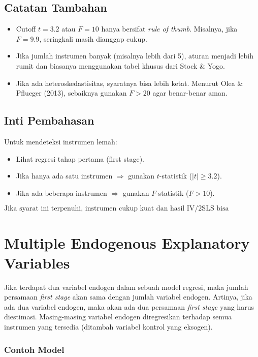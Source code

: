 \documentclass[]{article}
\begin{document}
\subsection*{Catatan Tambahan}
\begin{itemize}
    \item Cutoff $t = 3.2$ atau $F = 10$ hanya bersifat \textit{rule of thumb}. 
    Misalnya, jika $F = 9.9$, seringkali masih dianggap cukup.
    \item Jika jumlah instrumen banyak (misalnya lebih dari 5), aturan menjadi lebih rumit dan biasanya menggunakan tabel khusus dari Stock \& Yogo.
    \item Jika ada heteroskedastisitas, syaratnya bisa lebih ketat. 
    Menurut Olea \& Pflueger (2013), sebaiknya gunakan $F > 20$ agar benar-benar aman.
\end{itemize}

\subsection*{Inti Pembahasan}
Untuk mendeteksi instrumen lemah:
\begin{itemize}
    \item Lihat regresi tahap pertama (first stage).
    \item Jika hanya ada satu instrumen $\Rightarrow$ gunakan $t$-statistik ($|t| \geq 3.2$).
    \item Jika ada beberapa instrumen $\Rightarrow$ gunakan $F$-statistik ($F > 10$).
\end{itemize}

\[
\text{Jika syarat ini terpenuhi, instrumen cukup kuat dan hasil IV/2SLS bisa dipercaya.}
\]

\section{Multiple Endogenous Explanatory Variables}

Jika terdapat dua variabel endogen dalam sebuah model regresi, maka jumlah persamaan \textit{first stage} akan sama dengan jumlah variabel endogen. Artinya, jika ada dua variabel endogen, maka akan ada dua persamaan \textit{first stage} yang harus diestimasi. 
Masing-masing variabel endogen diregresikan terhadap semua instrumen yang tersedia (ditambah variabel kontrol yang eksogen).

\subsubsection*{Contoh Model}
\end{document}
